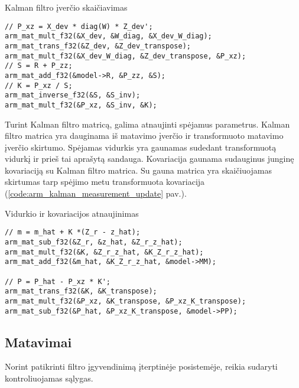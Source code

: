 \begin{cfigure}
    \centering
    \caption{Kalman filtro įverčio skaičiavimas}
    \label{code:arm_kalman_gain_calculation}
    \begin{lstlisting}
// P_xz = X_dev * diag(W) * Z_dev';
arm_mat_mult_f32(&X_dev, &W_diag, &X_dev_W_diag);
arm_mat_trans_f32(&Z_dev, &Z_dev_transpose);
arm_mat_mult_f32(&X_dev_W_diag, &Z_dev_transpose, &P_xz);
// S = R + P_zz;
arm_mat_add_f32(&model->R, &P_zz, &S);
// K = P_xz / S;
arm_mat_inverse_f32(&S, &S_inv);
arm_mat_mult_f32(&P_xz, &S_inv, &K);
    \end{lstlisting}
\end{cfigure}

Turint Kalman filtro matricą, galima atnaujinti spėjamus parametrus.
Kalman filtro matrica yra dauginama iš matavimo įverčio ir transformuoto matavimo įverčio skirtumo.
Spėjamas vidurkis yra gaunamas sudedant transformuotą vidurkį ir prieš tai aprašytą sandauga.
Kovariacija gaunama sudauginus junginę kovariaciją su Kalman filtro matrica.
Su gauna matrica yra skaičiuojamas skirtumas tarp spėjimo metu transformuota kovariacija (\ref{code:arm_kalman_measurement_update} pav.).

\begin{cfigure}
    \centering
    \caption{Vidurkio ir kovariacijos atnaujinimas}
    \label{code:arm_kalman_measurement_update}
    \begin{lstlisting}
// m = m_hat + K *(Z_r - z_hat);
arm_mat_sub_f32(&Z_r, &z_hat, &Z_r_z_hat);
arm_mat_mult_f32(&K, &Z_r_z_hat, &K_Z_r_z_hat);
arm_mat_add_f32(&m_hat, &K_Z_r_z_hat, &model->MM);

// P = P_hat - P_xz * K';
arm_mat_trans_f32(&K, &K_transpose);
arm_mat_mult_f32(&P_xz, &K_transpose, &P_xz_K_transpose);
arm_mat_sub_f32(&P_hat, &P_xz_K_transpose, &model->PP);
    \end{lstlisting}
\end{cfigure}

\subsection{Matavimai}

Norint patikrinti filtro įgyvendinimą įterptinėje posistemėje, reikia sudaryti kontroliuojamas sąlygas.
